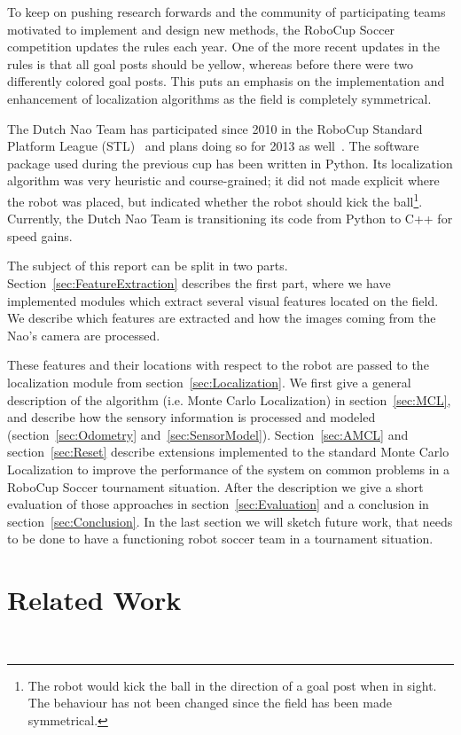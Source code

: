 \documentclass[	DIV=calc,%
							paper=a4,%
							fontsize=9pt,%
							twocolumn]{scrartcl}	 					%
\begin{document}
To keep on pushing research forwards and the community of participating teams motivated to implement and design new methods, the RoboCup Soccer competition updates the rules each year.  One of the more recent updates in the rules is that all goal posts should be yellow, whereas before there were two differently colored goal posts.  This puts an emphasis on the implementation and enhancement of localization algorithms as the field is completely symmetrical.

The Dutch Nao Team has participated since 2010 in the RoboCup Standard Platform League (STL)~\cite{DNT-TD10, DNT-TD11, DNT-TD12} and plans doing so for 2013 as well~\cite{DNT-TD13}.  The software package used during the previous cup has been written in Python.  Its localization algorithm was very heuristic and course-grained; it did not made explicit where the robot was placed, but indicated whether the robot should kick the ball\footnote{The robot would kick the ball in the direction of a goal post when in sight. The behaviour has not been changed since the field has been made symmetrical.}.  Currently, the Dutch Nao Team is transitioning its code from Python to C++ for speed gains. 

The subject of this report can be split in two parts. Section~\ref{sec:FeatureExtraction} describes the first part, where we have implemented modules which extract several visual features located on the field.  We describe which features are extracted and how the images coming from the Nao's camera are processed. 

These features and their locations with respect to the robot are passed to the localization module from section~\ref{sec:Localization}.  We first give a general description of the algorithm (i.e. Monte Carlo Localization) in section~\ref{sec:MCL}, and describe how the sensory information is processed and modeled (section~\ref{sec:Odometry} and~\ref{sec:SensorModel}). Section~\ref{sec:AMCL} and section~\ref{sec:Reset} describe extensions implemented to the standard Monte Carlo Localization to improve the performance of the system on common problems in a RoboCup Soccer tournament situation. 
After the description we give a short evaluation of those approaches in section~\ref{sec:Evaluation} and a conclusion in section~\ref{sec:Conclusion}. In the last section we will sketch future work, that needs to be done to have a functioning robot soccer team in a tournament situation.

\section{Related Work}
~\cite{canas2009visual}
~\cite{ashar2010robocup}
~\cite{canas2010recognition}
~\cite{schulz2012utilizing}
~\cite{deng2011natural}
\end{document}
